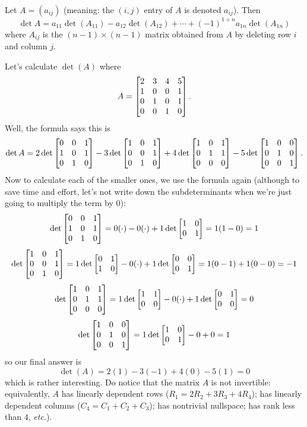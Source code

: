 \begin{definition}
Let $A = (a_{ij})$ (meaning:  the $(i,j)$ entry of $A$ is denoted $a_{ij}$).
Then
$$
\det A = a_{11}\det(A_{11}) - a_{12}\det(A_{12}) + \cdots + (-1)^{1+n}a_{1n}\det(A_{1n})
$$
where $A_{ij}$ is the $(n-1)\times(n-1)$ matrix obtained from $A$ by deleting 
row $i$ and column $j$.
\end{definition}

\begin{myexample}
Let's calculate $\det(A)$ where
$$
A= \left[ \begin{matrix} 
2 & 3 & 4 & 5 \\ 
1 & 0 & 0 & 1\\ 
0 & 1 & 0 & 1\\ 
0 & 0 & 1 & 0 \end{matrix} \right].
$$
Well, the formula says this is
$$
\det A = 2\det\left[ \begin{matrix} 0&0&1\\ 1&0&1\\ 0&1&0 \end{matrix} \right] - 3\det\left[ \begin{matrix} 1&0&1\\0&0&1\\0&1&0 \end{matrix} \right] +
4\det\left[ \begin{matrix} 1&0&1\\ 0&1&1\\ 0&0&0 \end{matrix} \right] - 5\det\left[ \begin{matrix} 1&0&0\\0&1&0\\0&0&1 \end{matrix} \right].
$$
Now to calculate each of the smaller ones, we use the formula again (although
to save time and effort, let's not write down the subdeterminants when
we're just going to multiply the term by 0):
$$
\det\left[ \begin{matrix} 0&0&1\\ 1&0&1\\ 0&1&0 \end{matrix} \right] = 0 (\cdot) - 0(\cdot) + 1\det\left[ \begin{matrix} 1&0\\0&1 \end{matrix} \right] = 1(1-0) = 1
$$
$$
\det\left[ \begin{matrix} 1&0&1\\0&0&1\\0&1&0 \end{matrix} \right] = 1\det\left[ \begin{matrix} 0&1\\1&0 \end{matrix} \right] - 0 (\cdot) + 1\det\left[ \begin{matrix} 0&0\\0&1 \end{matrix} \right] = 1(0-1) + 1(0-0) = -1
$$
$$
\det\left[ \begin{matrix} 1&0&1\\ 0&1&1\\ 0&0&0 \end{matrix} \right] = 1\det\left[ \begin{matrix} 1&1\\0&0 \end{matrix} \right] -0 (\cdot) + 1\det\left[ \begin{matrix} 0&1\\0&0 \end{matrix} \right] = 0
$$
$$
\det\left[ \begin{matrix} 1&0&0\\0&1&0\\0&0&1 \end{matrix} \right] = 1\det\left[ \begin{matrix} 1&0\\0&1 \end{matrix} \right] - 0 + 0 = 1
$$
so our final answer is
$$
\det(A) = 2(1)-3(-1) + 4(0) - 5(1) = 0
$$
which is rather interesting.  Do notice that the matrix $A$ is
not invertible: equivalently, $A$ has linearly dependent rows ($R_1=2R_2+3R_3+4R_4$); has
linearly dependent columns ($C_4=C_1+C_2+C_3$); has nontrivial nullspace; has rank less
than $4$, \emph{etc.}).
\end{myexample}

